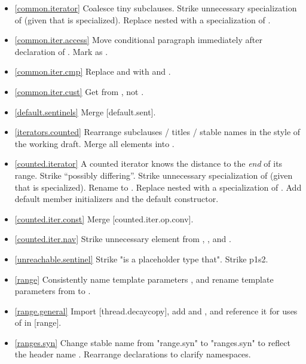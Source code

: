 \begin{itemize}
\item \ref{common.iterator} Coalesce tiny subclauses. Strike unnecessary
  specialization of  (given that 
  is specialized). Replace nested  with a specialization
  of .
\item \ref{common.iter.access} Move conditional  paragraph
  immediately after declaration of .
  Mark  as .
\item \ref{common.iter.cmp} Replace  and  with
   and .
\item \ref{common.iter.cust} Get  from , not .
\item \ref{default.sentinels} Merge [default.sent].
\item \ref{iterators.counted} Rearrange subclauses / titles / stable names
  in the style of the working draft. Merge all \returns elements into \effects.
\item \ref{counted.iterator} A counted iterator knows the distance to the
  \textit{end} of its range. Strike ``possibly differing''.
  Strike unnecessary specialization of 
  (given that  is specialized).
  Rename  to . Replace nested 
  with a specialization of .
  Add default member initializers and  the default constructor.
\item \ref{counted.iter.const} Merge [counted.iter.op.conv].
\item \ref{counted.iter.nav} Strike unnecessary \expects element from
  , , and
  .
\item \ref{unreachable.sentinel} Strike "is a placeholder type that".
  Strike p1s2.
\item \ref{range} Consistently name
   template parameters ,
  and rename  template parameters from  to .
\item \ref{range.general} Import [thread.decaycopy], add  and
  , and reference it for uses of  in [range].
\item \ref{ranges.syn} Change stable name from "range.syn" to "ranges.syn" to
  reflect the header name .
  Rearrange declarations to clarify namespaces.

\end{itemize}
